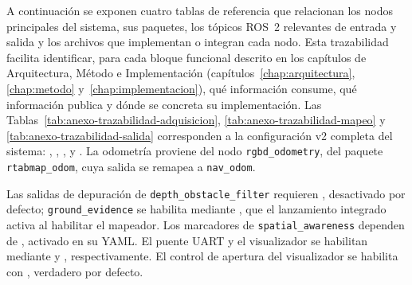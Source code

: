 A continuación se exponen cuatro tablas de referencia que relacionan los nodos principales del sistema, sus paquetes, los tópicos ROS~2 relevantes de entrada y salida y los archivos que implementan o integran cada nodo. Esta trazabilidad facilita identificar, para cada bloque funcional descrito en los capítulos de Arquitectura, Método e Implementación (capítulos~\ref{chap:arquitectura}, \ref{chap:metodo} y~\ref{chap:implementacion}), qué información consume, qué información publica y dónde se concreta su implementación. Las Tablas~\ref{tab:anexo-trazabilidad-adquisicion}, \ref{tab:anexo-trazabilidad-mapeo} y \ref{tab:anexo-trazabilidad-salida} corresponden a la configuración v2 completa del sistema: , , ,  y . La odometría proviene del nodo \texttt{rgbd\_odometry}, del paquete \texttt{rtabmap\_odom}, cuya salida se remapea a \texttt{nav\_odom}.

Las salidas de depuración de \texttt{depth\_obstacle\_filter} requieren , desactivado por defecto; \texttt{ground\_evidence} se habilita mediante , que el lanzamiento integrado activa al habilitar el mapeador. Los marcadores de \texttt{spatial\_awareness} dependen de , activado en su YAML. El puente UART y el visualizador se habilitan mediante  y , respectivamente. El control de apertura del visualizador se habilita con , verdadero por defecto.

